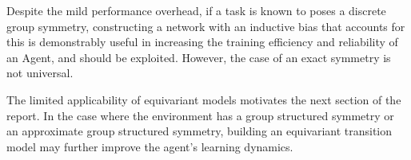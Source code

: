 Despite the mild performance overhead, if a task is known to poses a discrete group symmetry, constructing a network with an inductive bias that accounts for this is demonstrably useful in increasing the training efficiency and reliability of an Agent, and should be exploited. However, the case of an exact symmetry is not universal.

The limited applicability of equivariant models motivates the next section of the report. In the case where the environment has a group structured symmetry or an approximate group structured symmetry, building an equivariant transition model may further improve the agent's learning dynamics.



